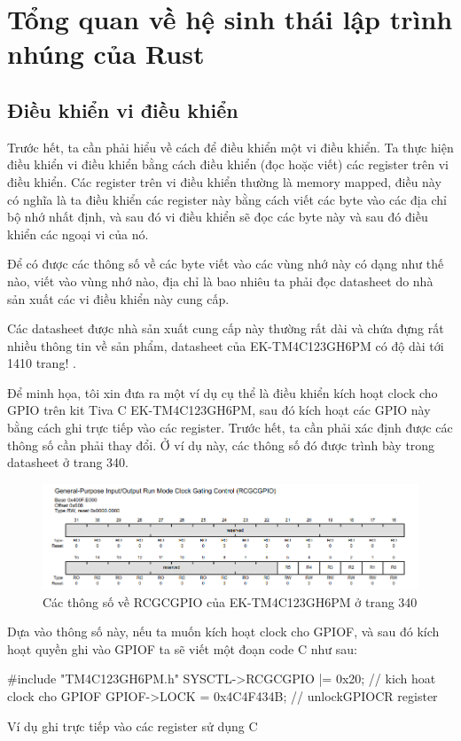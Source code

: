 \chapter{Tổng quan về hệ sinh thái lập trình nhúng của Rust}
\section{Điều khiển vi điều khiển}
Trước hết, ta cần phải hiểu về cách để điều khiển một vi điều khiển.
Ta thực hiện điều khiển vi điều khiển bằng cách điều khiển (đọc hoặc viết) các register trên vi điều khiển.
Các register trên vi điều khiển thường là memory mapped, điều này có nghĩa là ta điều khiển các register này bằng cách viết các byte vào các địa chỉ bộ nhớ nhất định, và sau đó vi điều khiển sẽ đọc các byte này và sau đó điều khiển các ngoại vi của nó.

Để có được các thông số về các byte viết vào các vùng nhớ này có dạng như thế nào, viết vào vùng nhớ nào, địa chỉ là bao nhiêu ta phải đọc datasheet do nhà sản xuất các vi điều khiển này cung cấp.

Các datasheet được nhà sản xuất cung cấp này thường rất dài và chứa đựng rất nhiều thông tin về sản phẩm, datasheet của EK-TM4C123GH6PM có độ dài tới 1410 trang! \cite{tivac_datasheet}.

Để minh họa, tôi xin đưa ra một ví dụ cụ thể là điều khiển kích hoạt clock cho GPIO trên kit Tiva C EK-TM4C123GH6PM, sau đó kích hoạt các GPIO này bằng cách ghi trực tiếp vào các register.
Trước hết, ta cần phải xác định được các thông số cần phải thay đổi. Ở ví dụ này, các thông số đó được trình bày trong datasheet ở trang 340.
\begin{figure}[ht]
\centering
\includegraphics[scale=0.5]{images/tivac_datasheet_example.png}
\caption{Các thông số về RCGCGPIO của EK-TM4C123GH6PM ở trang 340}
\end{figure}

Dựa vào thông số này, nếu ta muốn kích hoạt clock cho GPIOF, và sau đó kích hoạt quyền ghi vào GPIOF ta sẽ viết một đoạn code C như sau:
\begin{listing}[ht]
\begin{ccode}
#include "TM4C123GH6PM.h"
SYSCTL->RCGCGPIO |= 0x20; // kich hoat clock cho GPIOF
GPIOF->LOCK = 0x4C4F434B; // unlockGPIOCR register
\end{ccode}
\caption{Ví dụ ghi trực tiếp vào các register sử dụng C}
\end{listing}

